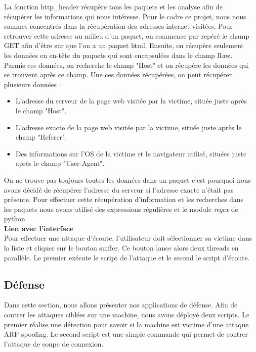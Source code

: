 \documentclass[11pt]{article}
\begin{document}
La fonction http\_header récupère tous les paquets et les analyse afin de récupérer les informations qui nous intéresse. Pour le cadre ce projet, nous nous sommes concentrés dans la récupération des adresses internet visitées. Pour retrouver cette adresse au milieu d'un paquet, on commence par repéré le champ GET afin d'être sur que l'on a un paquet html. Ensuite, on récupère seulement les données en en-tête du paquets qui sont encapsulées dans le champ Raw.  Parmis ces données, on recherche le champ "Host" et on récupère les données qui se trouvent après ce champ. 
Une ces données récupérées, on peut récupérer plusieurs données : 
\begin{itemize}
\item L'adresse du serveur de la page web visitée par la victime, située juste après le champ "Host".
\item L'adresse exacte de la page web visitée par la victime, située juste après le champ "Referer".
\item Des informations sur l'OS de la victime et le navigateur utilisé, situées juste après le champ "User-Agent".
\end{itemize}
On ne trouve pas toujours toutes les données dans un paquet c'est pourquoi nous avons décidé de récupérer l'adresse du serveur si l'adresse exacte n'était pas présente. Pour effectuer cette récupération d'information et les recherches dans les paquets nous avons utilisé des expressions régulières et le module \textit{regex} de python.
 ~\\


\textbf{Lien avec l'interface}~\\

Pour effectuer une attaque d'écoute, l'utilisateur doit sélectionner sa victime dans la liste et cliquer sur le bouton sniffer. Ce bouton lance alors deux threads en parallèle. Le premier exécute le script de l'attaque et le second le script d'écoute.



\subsection{Défense}
Dans cette section, nous allons présenter nos applications de défense.
Afin de contrer les attaques ciblées sur une machine, nous avons déployé deux scripts. Le premier réalise une détection pour savoir si la machine est victime d'une attaque ARP spoofing. Le second script est une simple commande qui permet de contrer l'attaque de coupe de connexion. ~\\
\end{document}
